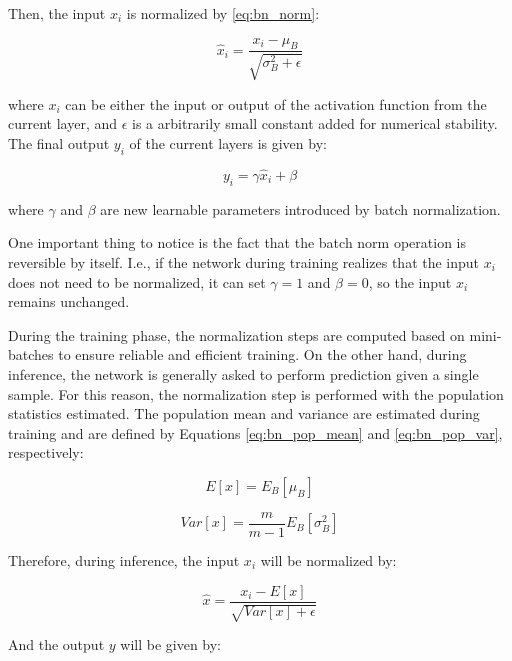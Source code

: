 Then, the input $x_i$ is normalized by \autoref{eq:bn_norm}:

\begin{equation}
\label{eq:bn_norm}
\hat{x}_i = \frac{x_i - \mu_B}{\sqrt{\sigma_B^{2} + \epsilon}}
\end{equation}

\noindent
where $x_i$ can be either the input or output of the activation function from the current layer, and $\epsilon$ is a arbitrarily small constant added for numerical stability. The final output $y_i$ of the current layers is given by:

\begin{equation}
\label{eq:bn_output}
y_i = \gamma\hat{x}_i + \beta
\end{equation}

\noindent
where $\gamma$ and $\beta$ are new learnable parameters introduced by batch normalization. 

One important thing to notice is the fact that the batch norm operation is reversible by itself. I.e., if the network during training realizes that the input $x_i$ does not need to be normalized, it can set $\gamma=1$ and $\beta=0$, so the input $x_i$ remains unchanged.

During the training phase, the normalization steps are computed based on mini-batches to ensure reliable and efficient training. On the other hand, during inference, the network is generally asked to perform prediction given a single sample. For this reason, the normalization step is performed with the population statistics estimated. The population mean and variance are estimated during training and are defined by Equations \ref{eq:bn_pop_mean} and \ref{eq:bn_pop_var}, respectively: 

\begin{equation}
\label{eq:bn_pop_mean}
E[x] = E_B[\mu_B]
\end{equation}

\begin{equation}
\label{eq:bn_pop_var}
Var[x] = \frac{m}{m-1} E_B[\sigma_B^{2}]
\end{equation}

Therefore, during inference, the input $x_i$ will be normalized by:

\begin{equation}
\label{eq:bn_inf_xi}
\hat{x} = \frac{x_i - E[x]}{\sqrt{Var[x] + \epsilon}}
\end{equation}

And the output $y$ will be given by:

